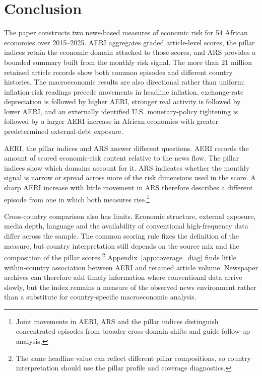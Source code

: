 \documentclass[12pt]{article}
\begin{document}
\FloatBarrier

\section{Conclusion}\label{sec:summary}
The paper constructs two news-based measures of economic risk for 54 African economies over 2015--2025. AERI aggregates graded article-level scores, the pillar indices retain the economic domain attached to those scores, and ARS provides a bounded summary built from the monthly risk signal. The more than 21 million retained article records show both common episodes and different country histories. The macroeconomic results are also directional rather than uniform: inflation-risk readings precede movements in headline inflation, exchange-rate depreciation is followed by higher AERI, stronger real activity is followed by lower AERI, and an externally identified U.S. monetary-policy tightening is followed by a larger AERI increase in African economies with greater predetermined external-debt exposure.

AERI, the pillar indices and ARS answer different questions. AERI records the amount of scored economic-risk content relative to the news flow. The pillar indices show which domains account for it. ARS indicates whether the monthly signal is narrow or spread across more of the risk dimensions used in the score. A sharp AERI increase with little movement in ARS therefore describes a different episode from one in which both measures rise.\footnote{Joint movements in AERI, ARS and the pillar indices distinguish concentrated episodes from broader cross-domain shifts and guide follow-up analysis.}

Cross-country comparison also has limits. Economic structure, external exposure, media depth, language and the availability of conventional high-frequency data differ across the sample. The common scoring rule fixes the definition of the measure, but country interpretation still depends on the source mix and the composition of the pillar scores.\footnote{The same headline value can reflect different pillar compositions, so country interpretation should use the pillar profile and coverage diagnostics.} Appendix~\ref{app:coverage_diag} finds little within-country association between AERI and retained article volume. Newspaper archives can therefore add timely information where conventional data arrive slowly, but the index remains a measure of the observed news environment rather than a substitute for country-specific macroeconomic analysis.
\end{document}
